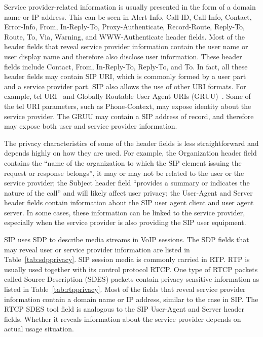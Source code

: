\documentclass[letterpaper,notitlepage,times,12pt]{article}
\begin{document}
Service provider-related information is usually presented in the form of a domain name or IP address. This can be seen in {\sf Alert-Info}, {\sf Call-ID}, {\sf Call-Info}, {\sf Contact}, {\sf Error-Info}, {\sf From}, {\sf In-Reply-To}, {\sf Proxy-Authenticate}, {\sf Record-Route}, {\sf Reply-To}, {\sf Route}, {\sf To}, {\sf Via}, {\sf Warning}, and {\sf WWW-Authenticate} header fields.
Most of the header fields that reveal service provider information contain the user name or user display name and therefore also disclose user information. These header fields include {\sf Contact}, {\sf From}, {\sf In-Reply-To}, {\sf Reply-To}, and {\sf To}. In fact, all these header fields may contain SIP URI, which is commonly formed by a user part and a service provider part. SIP also allows the use of other URI formats. For example, tel URI~\cite{rfc3966} and Globally Routable User Agent URIs (GRUU)~\cite{gruu}. Some of the tel URI parameters, such as {\sf Phone-Context}, may expose identity about the service provider. The GRUU may contain a SIP address of record, and therefore may expose both user and service provider information.

The privacy characteristics of some of the header fields is less straightforward and depends highly on how they are used. For example, the {\sf Organization} header field contains the ``name of the organization to which the SIP element issuing the request or response belongs\cite{rfc3261}'', it may or may not be related to the user or the service provider; the {\sf Subject} header field ``provides a summary or indicates the nature of the call\cite{rfc3261}'' and will likely affect user privacy; the {\sf User-Agent} and {\sf Server} header fields contain information about the SIP user agent client and user agent server. In some cases, these information can be linked to the service provider, especially when the service provider is also providing the SIP user equipment.


SIP uses SDP to describe media streams in VoIP sessions. The SDP fields that may reveal user or service provider information are listed in Table~\ref{tab:sdpprivacy}. SIP session media is commonly carried in RTP\cite{rfc3550}. RTP is usually used together with its control protocol RTCP. One type of RTCP packets called Source Description (SDES) packets contain privacy-sensitive information as listed in Table~\ref{tab:rtpprivacy}. Most of the fields that reveal service provider information contain a domain name or IP address, similar to the case in SIP. The RTCP SDES {\sf tool} field is analogous to the SIP {\sf User-Agent} and {\sf Server} header fields. Whether it reveals information about the service provider depends on actual usage situation.
\end{document}
